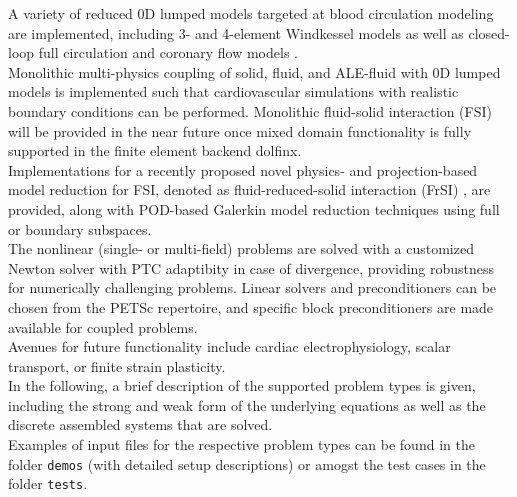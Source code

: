 \documentclass[a4paper,12pt]{report}
\begin{document}
A variety of reduced 0D lumped models targeted at blood circulation modeling are implemented, including 3- and 4-element Windkessel models \cite{westerhof2009} as well as closed-loop full circulation \cite{hirschvogel2017} and coronary flow models \cite{arthurs2016}.\\

Monolithic multi-physics coupling of solid, fluid, and ALE-fluid with 0D lumped models is implemented such that cardiovascular simulations with realistic boundary conditions can be performed. Monolithic fluid-solid interaction (FSI) will be provided in the near future once mixed domain functionality is fully supported in the finite element backend dolfinx.\\

Implementations for a recently proposed novel physics- and projection-based model reduction for FSI, denoted as fluid-reduced-solid interaction (FrSI) \cite{hirschvogel2022preprint}, are provided, along with POD-based Galerkin model reduction techniques \cite{farhat2014} using full or boundary subspaces.\\

The nonlinear (single- or multi-field) problems are solved with a customized Newton solver with PTC \cite{gee2009} adaptibity in case of divergence, providing robustness for numerically challenging problems. Linear solvers and preconditioners can be chosen from the PETSc repertoire, and specific block preconditioners are made available for coupled problems.\\

Avenues for future functionality include cardiac electrophysiology, scalar transport, or finite strain plasticity.\\

In the following, a brief description of the supported problem types is given, including the strong and weak form of the underlying equations as well as the discrete assembled systems that are solved.\\

Examples of input files for the respective problem types can be found in the folder \verb.demos. (with detailed setup descriptions) or amogst the test cases in the folder \verb.tests..

\end{document}
